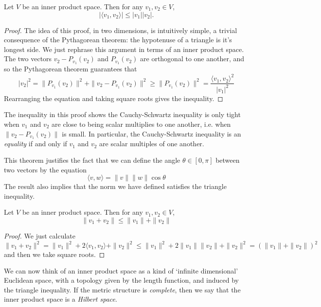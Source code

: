 \begin{theorem}
    Let $V$ be an inner product space. Then for any $v_1,v_2 \in V$,
    \[ |\langle v_1, v_2 \rangle| \leq |v_1||v_2|. \]
\end{theorem}
\begin{proof}
    The idea of this proof, in two dimensions, is intuitively simple, a trivial consequence of the Pythagorean theorem: the hypotenuse of a triangle is it's longest side. We just rephrase this argument in terms of an inner product space. The two vectors $v_2 - P_{v_1}(v_2)$ and $P_{v_1}(v_2)$ are orthogonal to one another, and so the Pythagorean theorem guarantees that
    \[ |v_2|^2 = \| P_{v_1}(v_2) \|^2 + \| v_2 - P_{v_1}(v_2) \|^2 \geq \| P_{v_1}(v_2) \|^2 = \frac{\langle v_1, v_2 \rangle^2}{|v_1|^2} \]
    Rearranging the equation and taking square roots gives the inequality.
\end{proof}

\begin{remark}
    The inequality in this proof shows the Cauchy-Schwartz inequality is only tight when $v_1$ and $v_2$ are close to being scalar multiplies to one another, i.e. when $\| v_2 - P_{v_1}(v_2) \|$ is small. In particular, the Cauchy-Schwartz inequality is an \emph{equality} if and only if $v_1$ and $v_2$ are scalar multiples of one another.
\end{remark}

This theorem justifies the fact that we can define the angle $\theta \in [0,\pi]$ between two vectors by the equation
%
\[ \langle v, w \rangle = \|v\| \|w\| \cos \theta \]
%
The result also implies that the norm we have defined satisfies the triangle inequality.

\begin{theorem}
    Let $V$ be an inner product space. Then for any $v_1,v_2 \in V$,
    \[ \| v_1 + v_2 \| \leq \| v_1 \| + \| v_2 \| \]
\end{theorem}
\begin{proof}
    We just calculate
    \[ \| v_1 + v_2 \|^2 = \| v_1 \|^2 + 2 \langle v_1, v_2 \rangle + \| v_2 \|^2 \leq \| v_1 \|^2 + 2 \|v_1\| \|v_2\| + \|v_2\|^2 = \left(\|v_1 \| + \|v_2\| \right)^2 \]
    and then we take square roots.
\end{proof}

We can now think of an inner product space as a kind of `infinite dimensional' Euclidean space, with a topology given by the length function, and induced by the triangle inequality. If the metric structure is {\it complete}, then we say that the inner product space is a \emph{Hilbert space}.

